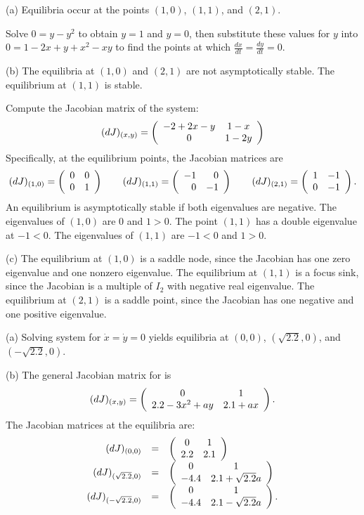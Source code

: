 \documentclass{ximera}
\begin{document}
\begin{figure}[htb]
                       \centerline{%
                       }
\end{figure}

\newpage
{}
(a) \ans Equilibria occur at the points $(1,0)$, $(1,1)$, and $(2,1)$.

\soln Solve $0 = y - y^2$ to obtain $y = 1$ and $y = 0$, then substitute
these values for $y$ into $0 = 1 - 2x + y + x^2 - xy$ to find the points
at which $\frac{dx}{dt} = \frac{dy}{dt} = 0$.

(b) \ans The equilibria at $(1,0)$ and $(2,1)$ are not asymptotically
stable.  The equilibrium at $(1,1)$ is stable.

\soln Compute the Jacobian matrix of the system:
\[
(dJ)_{(x,y)} = \left(\begin{array}{cc} -2 + 2x - y & 1 - x\\ 0 &1 - 2y\end{array}\right)
\]
Specifically, at the equilibrium points, the Jacobian matrices are
\[
(dJ)_{(1,0)} = \left(\begin{array}{rr} 0 & 0\\ 0 &1\end{array}\right) \qquad (dJ)_{(1,1)} =
\left(\begin{array}{rr} -1 & 0\\ 0 &-1\end{array}\right) \qquad (dJ)_{(2,1)} = \left(\begin{array}{rr} 1 & -1\\ 0 &-1\end{array}\right).
\]
An equilibrium is asymptotically stable if both eigenvalues are
negative.  The eigenvalues of $(1,0)$ are $0$ and $1 > 0$.
The point $(1,1)$ has a double eigenvalue at $-1 < 0$.
The eigenvalues of $(1,1)$ are $-1 < 0$ and $1 > 0$.

(c) The equilibrium at $(1,0)$ is a saddle node, since the Jacobian
has one zero eigenvalue and one nonzero eigenvalue.  The equilibrium
at $(1,1)$ is a focus sink, since the Jacobian is a multiple of $I_2$
with negative real eigenvalue.  The equilibrium at $(2,1)$ is a
saddle point, since the Jacobian has one negative and one positive
eigenvalue.

(a) Solving system  for $\dot{x} = \dot{y} = 0$
yields equilibria at $(0,0)$, $(\sqrt{2.2},0)$, and $(-\sqrt{2.2},0)$.

(b) The general Jacobian matrix for  is
\[
(dJ)_{(x,y)} = \left(\begin{array}{cc} 0 & 1\\ 2.2 - 3x^2 + ay &2.1 + ax\end{array}\right).
\]
The Jacobian matrices at the equilibria are:
\[ \begin{array}{rcl}
(dJ)_{(0,0)} & = & \left(\begin{array}{cc} 0 & 1\\ 2.2 &2.1\end{array}\right) \\
(dJ)_{(\sqrt{2.2},0)} & = & \left(\begin{array}{cc} 0 & 1\\ -4.4 &2.1 + \sqrt{2.2}a\end{array}\right) \\
(dJ)_{(-\sqrt{2.2},0)} & = & \left(\begin{array}{cc} 0 & 1\\ -4.4 &2.1 - \sqrt{2.2}a\end{array}\right). \\
\end{array}
\]
\end{document}
